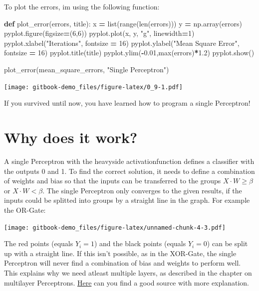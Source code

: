 \documentclass[
]{book}
\newenvironment{Shaded}{\begin{snugshade}}{\end{snugshade}}
\newcommand{\BuiltInTok}[1]{#1}
\newcommand{\DecValTok}[1]{\textcolor[rgb]{0.00,0.00,0.81}{#1}}
\newcommand{\FloatTok}[1]{\textcolor[rgb]{0.00,0.00,0.81}{#1}}
\newcommand{\KeywordTok}[1]{\textcolor[rgb]{0.13,0.29,0.53}{\textbf{#1}}}
\newcommand{\NormalTok}[1]{#1}
\newcommand{\OperatorTok}[1]{\textcolor[rgb]{0.81,0.36,0.00}{\textbf{#1}}}
\newcommand{\StringTok}[1]{\textcolor[rgb]{0.31,0.60,0.02}{#1}}
\begin{document}
To plot the errors, im using the following function:

\begin{Shaded}
\begin{Highlighting}[]
\KeywordTok{def}\NormalTok{ plot\_error(errors, title):}
\NormalTok{  x }\OperatorTok{=} \BuiltInTok{list}\NormalTok{(}\BuiltInTok{range}\NormalTok{(}\BuiltInTok{len}\NormalTok{(errors)))}
\NormalTok{  y }\OperatorTok{=}\NormalTok{ np.array(errors)}
\NormalTok{  pyplot.figure(figsize}\OperatorTok{=}\NormalTok{(}\DecValTok{6}\NormalTok{,}\DecValTok{6}\NormalTok{))}
\NormalTok{  pyplot.plot(x, y, }\StringTok{"g"}\NormalTok{, linewidth}\OperatorTok{=}\DecValTok{1}\NormalTok{)}
\NormalTok{  pyplot.xlabel(}\StringTok{"Iterations"}\NormalTok{, fontsize }\OperatorTok{=} \DecValTok{16}\NormalTok{)}
\NormalTok{  pyplot.ylabel(}\StringTok{"Mean Square Error"}\NormalTok{, fontsize }\OperatorTok{=} \DecValTok{16}\NormalTok{)}
\NormalTok{  pyplot.title(title)}
\NormalTok{  pyplot.ylim(}\OperatorTok{{-}}\FloatTok{0.01}\NormalTok{,}\BuiltInTok{max}\NormalTok{(errors)}\OperatorTok{*}\FloatTok{1.2}\NormalTok{)}
\NormalTok{  pyplot.show()}
  
  
\NormalTok{plot\_error(mean\_square\_errors, }\StringTok{"Single Perceptron"}\NormalTok{)}
\end{Highlighting}
\end{Shaded}

\texttt{[image: gitbook-demo\_files/figure-latex/0\_9-1.pdf]}

If you survived until now, you have learned how to program a single Perceptron!

\hypertarget{why-does-it-work}{%
\section{Why does it work?}\label{why-does-it-work}}

A single Perceptron with the heavyside activationfunction defines a classifier with the outputs 0 and 1. To find the correct solution, it needs to define a combination of weights and bias so that the inputs can be transferred to the groups \(X \cdot W \geq \beta\) or \(X \cdot W < \beta\). The single Perceptron only converges to the given results, if the inputs could be splitted into groups by a straight line in the graph. For example the OR-Gate:

\texttt{[image: gitbook-demo\_files/figure-latex/unnamed-chunk-4-3.pdf]}

The red points (equals \(Y_i=1\)) and the black points (equals \(Y_i=0\)) can be split up with a straight line. If this isn't possible, as in the XOR-Gate, the single Perceptron will never find a combination of bias and weights to perform well. This explains why we need atleast multiple layers, as described in the chapter on multilayer Perceptrons. \href{https://towardsdatascience.com/how-neural-networks-solve-the-xor-problem-59763136bdd7}{Here} can you find a good source with more explanation.
\end{document}
